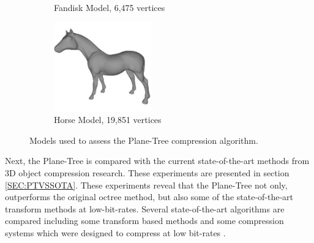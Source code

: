 \begin{figure}[t]
\begin{center}
\begin{subfigure}[b]{4.4cm}
                \captionsetup{justification=centering}
                \caption{Fandisk Model, 6,475 vertices}
                \label{fig:MODELSUSEDA_FANDISK}
        \end{subfigure}%
        \begin{subfigure}[b]{4.4cm}
                \includegraphics[width=4.2cm]{images/experiments/test_data/models_used/horse_19851}
                \captionsetup{justification=centering}
                \caption{Horse Model, 19,851 vertices}
                \label{fig:MODELSUSEDA_HORSE}
        \end{subfigure}
       \caption{Models used to assess the Plane-Tree compression algorithm.}
       \label{fig:MODELSUSEDA}
       \end{center}
\end{figure}




Next, the Plane-Tree is compared with the current state-of-the-art methods from 3D object compression research. These experiments are presented in section \ref{SEC:PTVSSOTA}. These experiments reveal that the Plane-Tree not only, outperforms the original octree method, but also some of the state-of-the-art transform methods at low-bit-rates. Several state-of-the-art algorithms are compared including some transform based methods \cite{Bayazit103DMesh,Khodakovsky00Progressive} and some compression systems which were designed to compress at low bit-rates \cite{Peng10Feature,Lincoln13Hons}. \\ 

